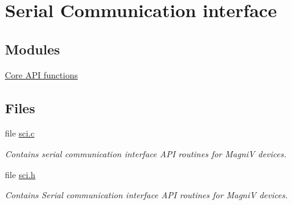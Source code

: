 \hypertarget{group___s_c_i}{}\section{Serial Communication interface}
\label{group___s_c_i}
\subsection*{Modules}
\begin{DoxyCompactItemize}
\item 
\hyperlink{group___core}{Core A\+P\+I functions}
\end{DoxyCompactItemize}
\subsection*{Files}
\begin{DoxyCompactItemize}
\item 
file \hyperlink{sci_8c}{sci.\+c}
\begin{DoxyCompactList}\small\item\em Contains serial communication interface A\+P\+I routines for Magni\+V devices. \end{DoxyCompactList}\item 
file \hyperlink{sci_8h}{sci.\+h}
\begin{DoxyCompactList}\small\item\em Contains Serial communication interface A\+P\+I routines for Magni\+V devices. \end{DoxyCompactList}\end{DoxyCompactItemize}
